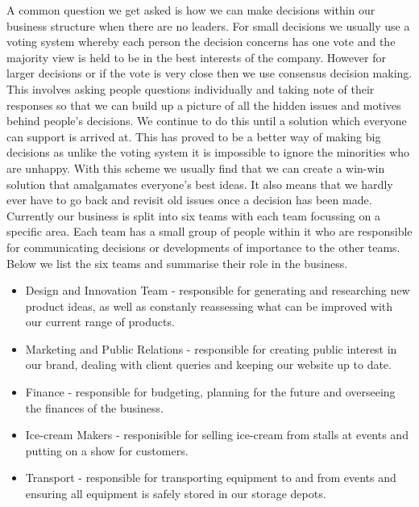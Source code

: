 \documentclass{article}
\begin{document}
  A common question we get asked is how we can make decisions within our business structure when there are no leaders. For small decisions we usually use a voting system whereby each person the decision concerns has one vote and the majority view is held to be in the best interests of the company. However for larger decisions or if the vote is very close then we use consensus decision making. This involves asking people questions individually and taking note of their responses so that we can build up a picture of all the hidden issues and motives behind people's decisions. We continue to do this until a solution which everyone can support is arrived at. This has proved to be a better way of making big decisions as unlike the voting system it is impossible to ignore the minorities who are unhappy. With this scheme we usually find that we can create a win-win solution that amalgamates everyone's best ideas. It also means that we hardly ever have to go back and revisit old issues once a decision has been made. \\

  Currently our business is split into six teams with each team focussing on a specific area. Each team has a small group of people within it who are responsible for communicating decisions or developments of importance to the other teams. Below we list the six teams and summarise their role in the business.
  \begin{itemize}

  \item Design and Innovation Team - responsible for generating and researching new product ideas, as well as constanly reassessing what can be improved with our current range of products.

  \item Marketing and Public Relations - responsible for creating public interest in our brand, dealing with client queries and keeping our website up to date.

  \item Finance - responsible for budgeting, planning for the future and overseeing the finances of the business.

  \item Ice-cream Makers - responisible for selling ice-cream from stalls at events and putting on a show for customers.

  \item Transport - responsible for transporting equipment to and from events and ensuring all equipment is safely stored in our storage depots.
  
  \end{itemize}
\end{document}
